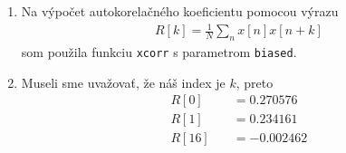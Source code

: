 \documentclass[10pt, a4paper, twocolumn]{article}
\begin{document}
\begin{enumerate}[leftmargin=*]
\item Na výpočet autokorelačného koeficientu pomocou výrazu 
\begin{align}
R[k] = \frac{1}{N}\sum\limits_n x[n]x[n+k]\nonumber
\end{align}
 som použila funkciu \texttt{xcorr} s parametrom \texttt{biased}.
\begin{figure}[H]
\centering
{}
\end{figure}

\item Museli sme uvažovať, že náš index je $k$, preto
\begin{align}
R[0] \quad&= 0.270576 \nonumber \\
R[1] \quad&= 0.234161 \nonumber \\
R[16] \quad&= -0.002462\nonumber
\end{align}


\end{enumerate}
\end{document}

